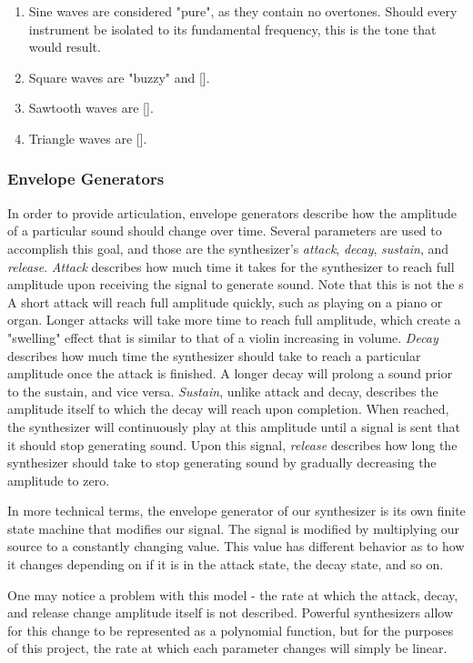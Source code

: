 \documentclass[12pt]{article}
\begin{document}
\begin{enumerate}
	\item Sine waves are considered "pure", as they contain no overtones. Should every instrument be isolated to its fundamental frequency, this is the tone that would result.
	\item Square waves are "buzzy" and [].
	\item Sawtooth waves are [].
	\item Triangle waves are [].
\end{enumerate}

\subsubsection{Envelope Generators}
In order to provide articulation, envelope generators describe how the amplitude of a particular sound should change over time. Several parameters are used to accomplish this goal, and those are the synthesizer's \textit{attack}, \textit{decay}, \textit{sustain}, and \textit{release}. \textit{Attack} describes how much time it takes for the synthesizer to reach full amplitude upon receiving the signal to generate sound. Note that this is not the s A short attack will reach full amplitude quickly, such as playing on a piano or organ. Longer attacks will take more time to reach full amplitude, which create a "swelling" effect that is similar to that of a violin increasing in volume. \textit{Decay} describes how much time the synthesizer should take to reach a particular amplitude once the attack is finished. A longer decay will prolong a sound prior to the sustain, and vice versa. \textit{Sustain}, unlike attack and decay, describes the amplitude itself to which the decay will reach upon completion. When reached, the synthesizer will continuously play at this amplitude until a signal is sent that it should stop generating sound. Upon this signal, \textit{release} describes how long the synthesizer should take to stop generating sound by gradually decreasing the amplitude to zero. 

In more technical terms, the envelope generator of our synthesizer is its own finite state machine that modifies our signal. The signal is modified by multiplying our source to a constantly changing value. This value has different behavior as to how it changes depending on if it is in the attack state, the decay state, and so on.  

One may notice a problem with this model - the rate at which the attack, decay, and release change amplitude itself is not described. Powerful synthesizers allow for this change to be represented as a polynomial function, but for the purposes of this project, the rate at which each parameter changes will simply be linear. 
\end{document}
